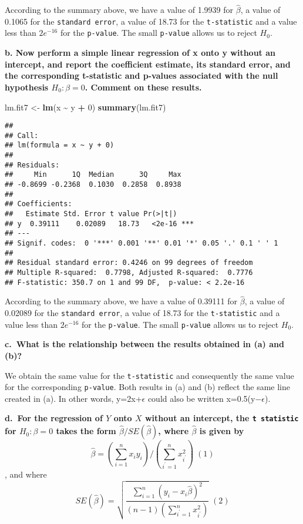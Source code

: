 \documentclass[
]{article}
\newenvironment{Shaded}{\begin{snugshade}}{\end{snugshade}}
\newcommand{\DecValTok}[1]{\textcolor[rgb]{0.00,0.00,0.81}{#1}}
\newcommand{\FunctionTok}[1]{\textcolor[rgb]{0.13,0.29,0.53}{\textbf{#1}}}
\newcommand{\NormalTok}[1]{#1}
\newcommand{\OtherTok}[1]{\textcolor[rgb]{0.56,0.35,0.01}{#1}}
\newcommand{\SpecialCharTok}[1]{\textcolor[rgb]{0.81,0.36,0.00}{\textbf{#1}}}
\begin{document}
According to the summary above, we have a value of 1.9939 for
\(\hat\beta\), a value of 0.1065 for the \texttt{standard\ error}, a
value of 18.73 for the \texttt{t-statistic} and a value less than
\(2e^{-16}\) for the \texttt{p-value}. The small \texttt{p-value} allows
us to reject \(H_0\).

\textbf{b. Now perform a simple linear regression of x onto y without an
intercept, and report the coefficient estimate, its standard error, and
the corresponding t-statistic and p-values associated with the null
hypothesis \(H_0 : \beta = 0\). Comment on these results.}

\begin{Shaded}
\begin{Highlighting}[]
\NormalTok{lm.fit7 }\OtherTok{\textless{}{-}} \FunctionTok{lm}\NormalTok{(x }\SpecialCharTok{\textasciitilde{}}\NormalTok{ y }\SpecialCharTok{+} \DecValTok{0}\NormalTok{)}
\FunctionTok{summary}\NormalTok{(lm.fit7)}
\end{Highlighting}
\end{Shaded}

\begin{verbatim}
## 
## Call:
## lm(formula = x ~ y + 0)
## 
## Residuals:
##     Min      1Q  Median      3Q     Max 
## -0.8699 -0.2368  0.1030  0.2858  0.8938 
## 
## Coefficients:
##   Estimate Std. Error t value Pr(>|t|)    
## y  0.39111    0.02089   18.73   <2e-16 ***
## ---
## Signif. codes:  0 '***' 0.001 '**' 0.01 '*' 0.05 '.' 0.1 ' ' 1
## 
## Residual standard error: 0.4246 on 99 degrees of freedom
## Multiple R-squared:  0.7798, Adjusted R-squared:  0.7776 
## F-statistic: 350.7 on 1 and 99 DF,  p-value: < 2.2e-16
\end{verbatim}

According to the summary above, we have a value of 0.39111 for
\(\hat\beta\), a value of 0.02089 for the \texttt{standard\ error}, a
value of 18.73 for the \texttt{t-statistic} and a value less than
\(2e^{-16}\) for the \texttt{p-value}. The small \texttt{p-value} allows
us to reject \(H_0\).

\textbf{c.~What is the relationship between the results obtained in (a)
and (b)?}

We obtain the same value for the \texttt{t-statistic} and consequently
the same value for the corresponding \texttt{p-value}. Both results in
(a) and (b) reflect the same line created in (a). In other words,
y=2x+\(\epsilon\) could also be written x=0.5(y−\(\epsilon\)).

\textbf{d.~For the regression of \(Y\) onto \(X\) without an intercept,
the \texttt{t\ statistic} for \(H_0: \beta=0\) takes the form
\(\hat{\beta}/SE(\hat{\beta})\), where \(\hat{\beta}\) is given by} \[
\hat{\beta}=\left(\sum_{i=1}^{n} x_{i} y_{i}\right) /\left(\sum_{i^{\prime}=1}^{n} x_{i^{\prime}}^2\right)\; (1)
\] , and where \[
SE(\hat{\beta})=\sqrt{\frac{\sum_{i=1}^{n}\left(y_{i}-x_{i} \hat{\beta}\right)^2}{(n-1) \left(\sum_{i^{\prime}=1}^{n} x_{i^{\prime}}^2\right)}}\; (2)
\]
\end{document}
